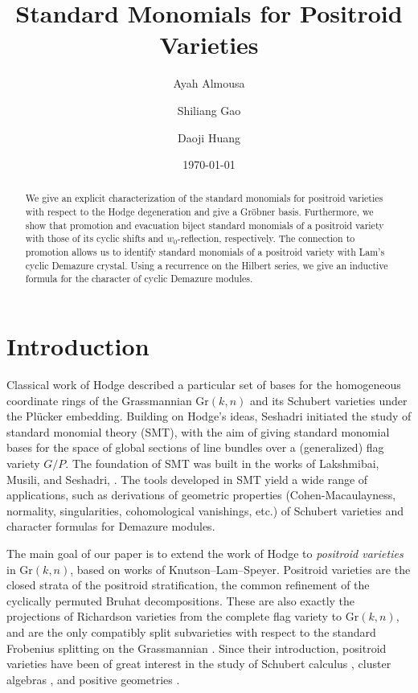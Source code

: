 \documentclass[12pt,reqno]{amsart}
\theoremstyle{definition}
\newcommand{\gr}{\mathrm{Gr}}
\begin{document}
\title[Standard Monomials for Positroid Varieties]{Standard Monomials for Positroid Varieties}
\author{Ayah Almousa}
\author{Shiliang Gao}
\author{Daoji Huang}



\keywords{}

\date{\today}
\begin{abstract}
We give an explicit characterization of the standard monomials for positroid varieties with respect to the Hodge degeneration and give a Gr\"obner basis. 
 Furthermore, we 
 show that promotion and evacuation 
 biject standard monomials of a positroid variety with those of its cyclic shifts and $w_0$-reflection, respectively.
The connection to promotion allows us to identify standard monomials of a positroid variety with Lam's cyclic Demazure crystal. Using a recurrence on the Hilbert series, we give an inductive formula for the character of cyclic Demazure modules.
\end{abstract}
\maketitle
 \tableofcontents
\section{Introduction}
\label{sec:intro}
Classical work of Hodge \cite{Hodge} described a particular set of bases for the homogeneous coordinate rings of the Grassmannian $\gr(k,n)$ and its Schubert varieties under the Pl\"ucker embedding.
Building on Hodge's ideas, Seshadri initiated the study of standard monomial theory (SMT), with the aim of giving standard monomial bases for the space of global sections of line bundles over a (generalized) flag variety $G/P$.
The foundation of SMT was built in the works of Lakshmibai, Musili, and Seshadri,  \cites{GmodP1, GmodP2, GmodP3, GmodP4, GmodP5}.
The tools developed in SMT yield a wide range of applications, such as derivations of geometric properties (Cohen-Macaulayness, normality, singularities, cohomological vanishings, etc.)\! of Schubert varieties and character formulas for Demazure modules.


The main goal of our paper is to extend the work of Hodge to \emph{positroid varieties} in $\gr(k,n)$, based on works of Knutson--Lam--Speyer. 
Positroid varieties are the closed strata of the positroid stratification, the common refinement of the cyclically permuted Bruhat decompositions.
These are also exactly the projections of Richardson varieties from the complete flag variety to $\gr(k,n)$, and are
 the only compatibly split subvarieties with respect to the standard Frobenius splitting on the Grassmannian \cite{KLS2014projections}.
Since their introduction, positroid varieties have been of great interest in the study of Schubert calculus \cite{K14interval}, cluster algebras \cite{GL23cluster}, and positive geometries \cite{AHBL17}.
\end{document}
